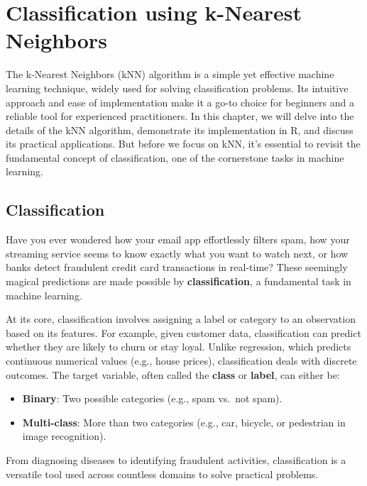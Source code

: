 \documentclass[
]{book}
\providecommand{\tightlist}{%
  \setlength{\itemsep}{0pt}\setlength{\parskip}{0pt}}
\theoremstyle{definition}
\theoremstyle{definition}
\theoremstyle{definition}
\theoremstyle{definition}
\theoremstyle{remark}
\begin{document}
\chapter{Classification using k-Nearest Neighbors}\label{chapter-knn}

The k-Nearest Neighbors (kNN) algorithm is a simple yet effective machine learning technique, widely used for solving classification problems. Its intuitive approach and ease of implementation make it a go-to choice for beginners and a reliable tool for experienced practitioners. In this chapter, we will delve into the details of the kNN algorithm, demonstrate its implementation in R, and discuss its practical applications. But before we focus on kNN, it's essential to revisit the fundamental concept of classification, one of the cornerstone tasks in machine learning.

\section{Classification}\label{classification}

Have you ever wondered how your email app effortlessly filters spam, how your streaming service seems to know exactly what you want to watch next, or how banks detect fraudulent credit card transactions in real-time? These seemingly magical predictions are made possible by \textbf{classification}, a fundamental task in machine learning.

At its core, classification involves assigning a label or category to an observation based on its features. For example, given customer data, classification can predict whether they are likely to churn or stay loyal. Unlike regression, which predicts continuous numerical values (e.g., house prices), classification deals with discrete outcomes. The target variable, often called the \textbf{class} or \textbf{label}, can either be:

\begin{itemize}
\tightlist
\item
  \textbf{Binary}: Two possible categories (e.g., spam vs.~not spam).\\
\item
  \textbf{Multi-class}: More than two categories (e.g., car, bicycle, or pedestrian in image recognition).
\end{itemize}

From diagnosing diseases to identifying fraudulent activities, classification is a versatile tool used across countless domains to solve practical problems.
\end{document}
